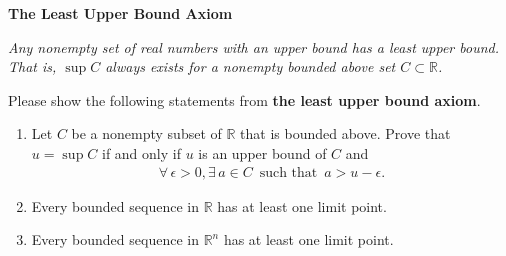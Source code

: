 \documentclass[11pt,letter,notitlepage]{article}
\theoremstyle{definition}
\begin{document}
\begin{exercise}
	\textbf{The Least Upper Bound Axiom}


	\emph{Any nonempty set of real numbers with an upper bound has a least upper bound. That is, $\sup  C$ always exists for a nonempty bounded above set $C \subset \mathbb{R}$.}

	Please show the following statements from \textbf{the least upper bound axiom}.
	\begin{enumerate}
		\item Let $C$ be a nonempty subset of $\mathbb{R}$ that is bounded above. Prove that $u = \sup C$ if and only if $u$ is an upper bound of $C$ and
		      \begin{align*}
			      \forall\,\epsilon>0,\exists\,a \in C\,\text{ such that }\,a>u-\epsilon.
		      \end{align*}
		\item  Every bounded sequence in $\mathbb{R}$ has at least one limit point.
		\item Every bounded sequence in $\mathbb{R}^n$ has at least one limit point.
	\end{enumerate}
\end{exercise}
\end{document}

